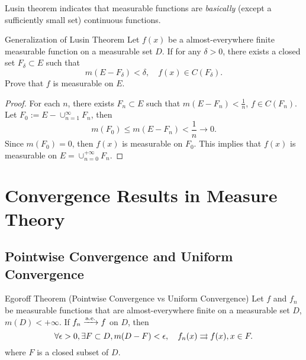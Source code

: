\begin{note}
  Lusin theorem indicates that measurable functions are
  \emph{basically} (except a sufficiently small set) continuous functions.
\end{note}

\begin{example}{Generalization of Lusin Theorem}{}
  Let $f(x)$ be a almost-everywhere finite measurable function on a measurable set $D$.
  If for any $\delta > 0$, there exists a closed set $F_{\delta} \subset E$ such that
  \begin{equation}
    m (E - F_{\delta}) < \delta, \quad f(x) \in C(F_{\delta}).
  \end{equation}
  Prove that $f$ is measurable on $E$.
\end{example}

\begin{proof}
  For each $n$, there exists $F_n \subset E$ such that $m(E - F_n) < \frac{1}{n}$,
  $f \in C(F_n)$.
  Let $F_0 := E - \cup _{n = 1}^{\infty}F_n$, then
  \begin{equation}
    m(F_0) \leq m (E - F_n) < \frac{1}{n} \rightarrow 0.
  \end{equation}
  Since $m(F_0) = 0$, then $f(x)$ is measurable on $F_0$.
  This implies that $f(x)$ is measurable on $E = \cup _{n = 0}^{+\infty}F_n$.
\end{proof}

\section{Convergence Results in Measure Theory}

\subsection{Pointwise Convergence and Uniform Convergence}

\begin{theorem}{Egoroff Theorem (Pointwise Convergence vs Uniform Convergence)}{}
  Let $f$ and $f_n$ be measurable functions that are almost-everywhere finite
  on a measurable set $D$, $m(D) < +\infty$.
  If $f_n \xrightarrow{\text{a.e.}} f$ on $D$,
  then
  \begin{equation}
    \forall \epsilon > 0, \exists F \subset D, m(D - F) < \epsilon, \quad
    f_n(x) \rightrightarrows f(x), x \in F.
  \end{equation}
  where $F$ is a closed subset of $D$.
\end{theorem}

